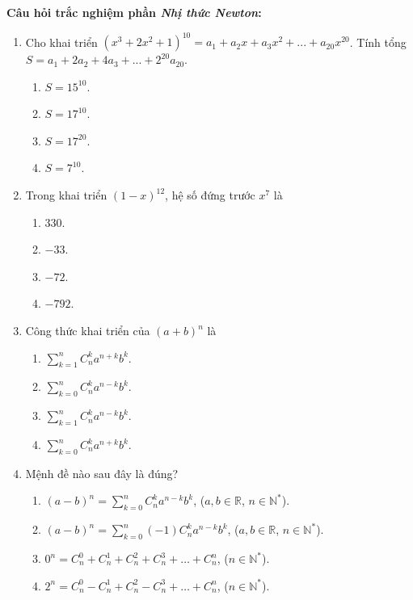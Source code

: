 \noindent\textbf{Câu hỏi trắc nghiệm phần \textit{Nhị thức Newton}:}\par
\begin{enumerate}[label=\textbf{Câu \arabic*.},align=left,left=0cm..0cm,itemindent=*]
	\item Cho khai triển $\left(x^3+2x^2+1\right)^{10}=a_1+a_2x+a_3x^2+...+a_{20}x^{20}$. Tính tổng $S=a_1+2a_2+4a_3+...+2^{20}a_{20}$.
	\begin{enumerate}[label=\textbf{\Alph*.},align=left,left=1cm..0cm,itemindent=*]
		\item $S=15^{10}$. \item $S=17^{10}$. \item $S=17^{20}$. \item $S=7^{10}$.
	\end{enumerate}
	\item Trong khai triển $(1-x)^{12}$, hệ số đứng trước $x^7$ là
	\begin{enumerate}[label=\textbf{\Alph*.},align=left,left=1cm..0cm,itemindent=*]
		\item $330$. \item $-33$. \item $-72$. \item $-792$.
	\end{enumerate}
	\item Công thức khai triển của $(a+b)^n$ là
	\begin{enumerate}[label=\textbf{\Alph*.},align=left,left=1cm..0cm,itemindent=*]
		\item $\sum_{k=1}^nC_n^ka^{n+k}b^k$. \item $\sum_{k=0}^nC_n^ka^{n-k}b^k$. \item $\sum_{k=1}^nC_n^ka^{n-k}b^k$. \item $\sum_{k=0}^nC_n^ka^{n+k}b^k$.
	\end{enumerate}
	\item Mệnh đề nào sau đây là đúng?
	\begin{enumerate}[label=\textbf{\Alph*.},align=left,left=1cm..0cm,itemindent=*]
		\item $(a-b)^n=\sum_{k=0}^nC_n^ka^{n-k}b^k$, ($a,b\in\mathbb{R}$, $n\in\mathbb{N}^{*}$).
		\item $(a-b)^n=\sum_{k=0}^n(-1)C_n^ka^{n-k}b^k$, ($a,b\in\mathbb{R}$, $n\in\mathbb{N}^{*}$).
		\item $0^n=C_n^0+C_n^1+C_n^2+C_n^3+\ldots+C_n^n$, ($n\in\mathbb{N}^{*}$).
		\item $2^n=C_n^0-C_n^1+C_n^2-C_n^3+\ldots+C_n^n$, ($n\in\mathbb{N}^{*}$).

\end{enumerate}
\end{enumerate}
